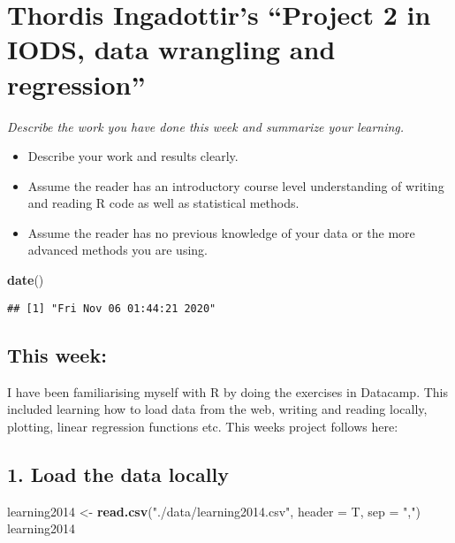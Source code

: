 \documentclass[
]{article}
\author{}
\date{\vspace{-2.5em}}
\newenvironment{Shaded}{\begin{snugshade}}{\end{snugshade}}
\newcommand{\DataTypeTok}[1]{\textcolor[rgb]{0.13,0.29,0.53}{#1}}
\newcommand{\KeywordTok}[1]{\textcolor[rgb]{0.13,0.29,0.53}{\textbf{#1}}}
\newcommand{\NormalTok}[1]{#1}
\newcommand{\StringTok}[1]{\textcolor[rgb]{0.31,0.60,0.02}{#1}}
\providecommand{\tightlist}{%
  \setlength{\itemsep}{0pt}\setlength{\parskip}{0pt}}
\begin{document}
\hypertarget{thordis-ingadottirs-project-2-in-iods-data-wrangling-and-regression}{%
\section{Thordis Ingadottir's ``Project 2 in IODS, data wrangling and
regression''}\label{thordis-ingadottirs-project-2-in-iods-data-wrangling-and-regression}}

\emph{Describe the work you have done this week and summarize your
learning.}

\begin{itemize}
\tightlist
\item
  Describe your work and results clearly.
\item
  Assume the reader has an introductory course level understanding of
  writing and reading R code as well as statistical methods.
\item
  Assume the reader has no previous knowledge of your data or the more
  advanced methods you are using.
\end{itemize}

\begin{Shaded}
\begin{Highlighting}[]
\KeywordTok{date}\NormalTok{()}
\end{Highlighting}
\end{Shaded}

\begin{verbatim}
## [1] "Fri Nov 06 01:44:21 2020"
\end{verbatim}

\hypertarget{this-week}{%
\subsection{This week:}\label{this-week}}

I have been familiarising myself with R by doing the exercises in
Datacamp. This included learning how to load data from the web, writing
and reading locally, plotting, linear regression functions etc. This
weeks project follows here:

\hypertarget{load-the-data-locally}{%
\subsection{1. Load the data locally}\label{load-the-data-locally}}

\begin{Shaded}
\begin{Highlighting}[]
\NormalTok{learning2014 <-}\StringTok{ }\KeywordTok{read.csv}\NormalTok{(}\StringTok{"./data/learning2014.csv"}\NormalTok{, }\DataTypeTok{header =}\NormalTok{ T, }\DataTypeTok{sep =} \StringTok{","}\NormalTok{)}
\NormalTok{learning2014}
\end{Highlighting}
\end{Shaded}
\end{document}
